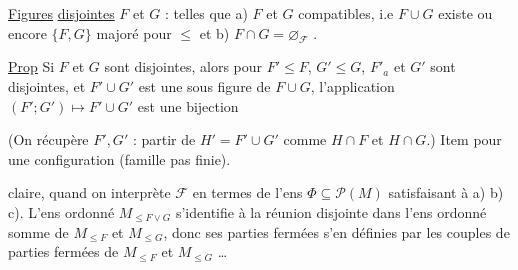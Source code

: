\uline{Figures} \uline{disjointes}  \uline{$F$} et \uline{$G$} : telles que a) $F$ et $G$ compatibles, i.e $F\cup G$ existe  ou encore $\{F,G\}$ majoré pour $\leq$ et b) $F\cap G=\varnothing_{\mathcal F}$  .


 \uline{Prop} Si $F$ et $G$ sont disjointes, alors pour $F'\leq F$, $G'\leq G$, $F'_{a}$ et $G'$ sont disjointes, et $F'\cup G'$ est une sous figure de $F\cup G$, l'application $(F';G')\mapsto F'\cup G'$ est une bijection 


(On récupère $F',G'$ : partir de $H'=F'\cup G'$ comme $H\cap F$ et $H\cap G$.) Item pour une   configuration (famille pas  finie). 

  claire, quand on interprète $\mathcal F$ en termes de l'ens $\Phi\subseteq\mathcal P(M)$ satisfaisant à a) b) c). L'ens ordonné $M_{\leq F\vee G}$ s'identifie à la réunion disjointe dans l'ens ordonné somme de $M_{\leq F}$ et $M_{\leq G}$, donc ses parties fermées  s'en définies par les couples de parties fermées de $M_{\leq F}$ et $M_{\leq G}$ \ldots

